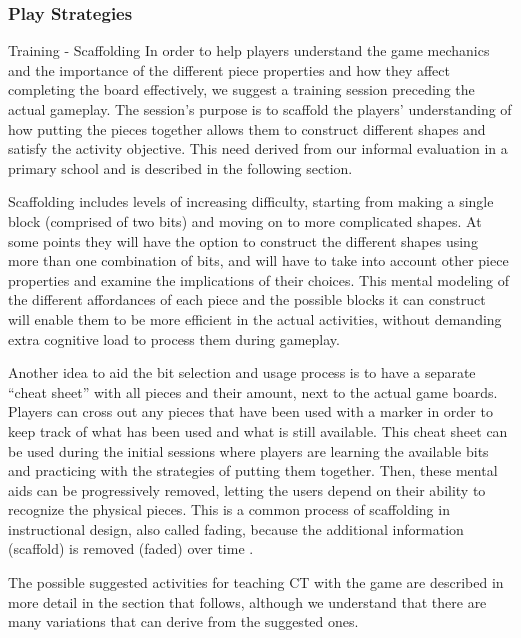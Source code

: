 \documentclass{acm_proc_article-sp}
\begin{document}
\subsubsection{Play Strategies}
Training - Scaffolding
In order to help players understand the game mechanics and the importance of the different piece properties and how they affect completing the board effectively, we suggest a training session preceding the actual gameplay. The session’s purpose is to scaffold the players’ understanding of how putting the pieces together allows them to construct different shapes and satisfy the activity objective. This need derived from our informal evaluation in a primary school and is described in the following section.

Scaffolding includes levels of increasing difficulty, starting from making a single block (comprised of two bits) and moving on to more complicated shapes. At some points they will have the option to construct the different shapes using more than one combination of bits, and will have to take into account other piece properties and examine the implications of their choices. This mental modeling of the different affordances of each piece and the possible blocks it can construct will enable them to be more efficient in the actual activities, without demanding extra cognitive load to process them during gameplay. 

Another idea to aid the bit selection and usage process is to have a separate ``cheat sheet'' with all pieces and their amount, next to the actual game boards. Players can cross out any pieces that have been used with a marker in order to keep track of what has been used and what is still available. This cheat sheet can be used during the initial sessions where players are learning the available bits and practicing with the strategies of putting them together. Then, these mental aids can be progressively removed, letting the users depend on their ability to recognize the physical pieces. This is a common process of scaffolding in instructional design, also called fading, because the additional information (scaffold) is removed (faded) over time \cite{driscoll2005psychology}.

The possible suggested activities for teaching CT with the game are described in more detail in the section that follows, although we understand that there are many variations that can derive from the suggested ones.
\end{document}
